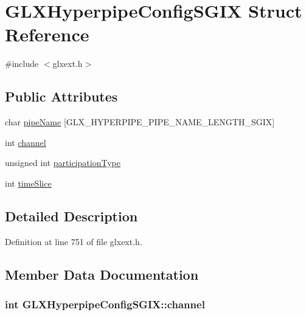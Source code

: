 \hypertarget{struct_g_l_x_hyperpipe_config_s_g_i_x}{
\section{GLXHyperpipeConfigSGIX Struct Reference}
\label{struct_g_l_x_hyperpipe_config_s_g_i_x}
}


{\ttfamily \#include $<$glxext.h$>$}

\subsection*{Public Attributes}
\begin{DoxyCompactItemize}
\item 
char \hyperlink{struct_g_l_x_hyperpipe_config_s_g_i_x_a9e3748f92005cac81cb44d4c67acccb8}{pipeName} \mbox{[}GLX\_\-HYPERPIPE\_\-PIPE\_\-NAME\_\-LENGTH\_\-SGIX\mbox{]}
\item 
int \hyperlink{struct_g_l_x_hyperpipe_config_s_g_i_x_abc812d8796ba89d5de4e33b3532d8335}{channel}
\item 
unsigned int \hyperlink{struct_g_l_x_hyperpipe_config_s_g_i_x_a093cfaaec305531f66e1120929b5b01b}{participationType}
\item 
int \hyperlink{struct_g_l_x_hyperpipe_config_s_g_i_x_afe9288e75dc1ae5e0f33eff978d7024d}{timeSlice}
\end{DoxyCompactItemize}


\subsection{Detailed Description}


Definition at line 751 of file glxext.h.



\subsection{Member Data Documentation}
\hypertarget{struct_g_l_x_hyperpipe_config_s_g_i_x_abc812d8796ba89d5de4e33b3532d8335}{
\subsubsection[{channel}]{\setlength{\rightskip}{0pt plus 5cm}int {\bf GLXHyperpipeConfigSGIX::channel}}}
\label{struct_g_l_x_hyperpipe_config_s_g_i_x_abc812d8796ba89d5de4e33b3532d8335}


